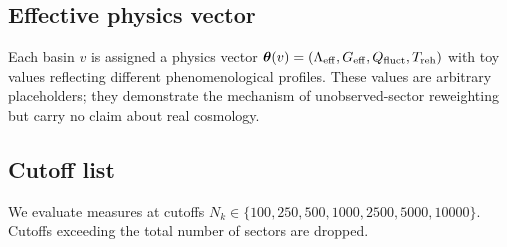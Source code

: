 \subsection{Effective physics vector}

Each basin $v$ is assigned a physics vector
$\boldsymbol{\theta}(v) = (\Lambda_{\rm eff}, G_{\rm eff}, Q_{\rm fluct}, T_{\rm reh})$
with toy values reflecting different phenomenological profiles.
These values are arbitrary placeholders; they demonstrate the mechanism
of unobserved-sector reweighting but carry no claim about real cosmology.

\subsection{Cutoff list}

We evaluate measures at cutoffs
$N_k \in \{100, 250, 500, 1000, 2500, 5000, 10000\}$.
Cutoffs exceeding the total number of sectors are dropped.
